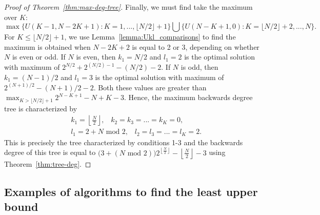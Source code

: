 \documentclass{article}
\begin{document}
\begin{proof}[Proof of Theorem~\ref{thm:max-deg-tree}]
\noindent Finally, we must find take the maximum over $K$: \[ \max \big \{ U(K-1, N-2K+1): K=1,..., \lfloor N/2 \rfloor +1 \big\} \bigcup \big\{U(N-K+1, 0): K=  \lfloor N/2 \rfloor +2 ,..., N\big \}. \] For $K\leq \lfloor N/2 \rfloor +1$, we use Lemma~\ref{lemma:Ukl_comparisons} to find the maximum is obtained when $N-2K+2$ is equal to 2 or 3, depending on whether $N$ is even or odd. If $N$ is even, then $k_1= N/2$ and $l_1 =2$ is the optimal solution with maximum of $2^{N/2} + 2^{(N/2)-1} -(N/2)-2$. If $N$ is odd, then $k_1 = (N-1)/2$ and $l_1=3$ is the optimal solution with maximum of $2^{(N+1)/2} - (N+1)/2 -2$. Both these values are greater than $\max_{K> \lfloor N/2 \rfloor +1} 2^{N-K+1}-N+K-3$. Hence, the maximum backwards degree tree is characterized by 
\begin{align*}
    & k_1=\left \lfloor \frac{N}{2}\right \rfloor, \;\; \; k_2=k_3=...=k_K=0, \\
    &l_1 = 2 + N \text{ mod } 2, \;\; \; l_2=l_3=...=l_K=2 . 
\end{align*}
This is precisely the tree characterized by conditions 1-3 and the backwards degree of this tree is equal to $\big (3+ (N \text{ mod } 2) \big) 2^{\left \lfloor \frac{N}{2} \right \rfloor} - \left \lfloor \frac{N}{2} \right \rfloor - 3$ using Theorem~\ref{thm:tree-deg}. 
\end{proof}

\subsection{Examples of algorithms to find the least upper bound} \label{subsec:lub-algs}
\end{document}
